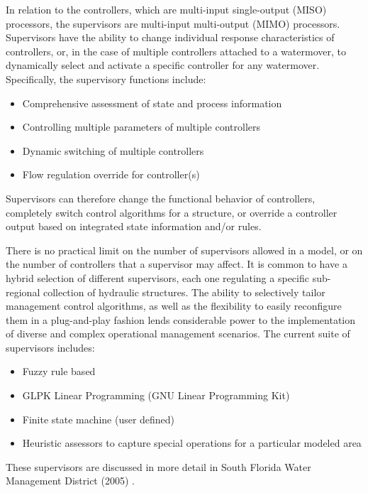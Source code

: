 In relation to the controllers, which are multi-input single-output
(MISO) processors, the supervisors are multi-input multi-output (MIMO)
processors. Supervisors have the ability to change individual response
characteristics of controllers, or, in the case of multiple
controllers attached to a watermover, to dynamically select and
activate a specific controller for any watermover. Specifically, the
supervisory functions include:

\begin{itemize}
 \item Comprehensive assessment of state and process information
 \item Controlling multiple parameters of multiple controllers
 \item Dynamic switching of multiple controllers
 \item Flow regulation override for controller(s)
\end{itemize}

Supervisors can therefore change the functional behavior of
controllers, completely switch control algorithms for a structure, or
override a controller output based on integrated state information
and/or rules.

There is no practical limit on the number of supervisors allowed in a
model, or on the number of controllers that a supervisor may
affect. It is common to have a hybrid selection of different
supervisors, each one regulating a specific sub-regional collection of
hydraulic structures. The ability to selectively tailor management
control algorithms, as well as the flexibility to easily reconfigure
them in a plug-and-play fashion lends considerable power to the
implementation of diverse and complex operational management
scenarios.  The current suite of supervisors includes:

\begin{itemize}
 \item Fuzzy rule based
 \item GLPK Linear Programming (GNU Linear Programming Kit)
 \item Finite state machine (user defined)
 \item Heuristic assessors to capture special operations for a
   particular modeled area
\end{itemize}

These supervisors are discussed in more detail in South Florida Water
Management District (2005) \nocite{sfwmda:2005}.

